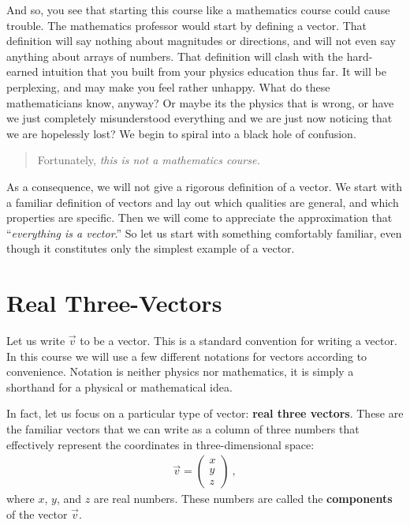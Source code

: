 \documentclass[12pt, oneside]{report}    %
\let\oldsection\section
\def\section{%
  \setcounter{sidenote}{1}%
  \oldsection
}
\begin{document}
And so, you see that starting this course like a mathematics course could cause trouble. The mathematics professor would start by defining a vector. That definition will say nothing about magnitudes or directions, and will not even say anything about arrays of numbers. That definition will clash with the hard-earned intuition that you built from your physics education thus far. It will be perplexing, and may make you feel rather unhappy. What do these mathematicians know, anyway? Or maybe its the physics that is wrong, or have we just completely misunderstood everything and we are just now noticing that we are hopelessly lost? We begin to spiral into a black hole of confusion.

\begin{quote}
Fortunately, \emph{this is not a mathematics course.}
\end{quote}

As a consequence, we will not give a rigorous definition of a vector. We start with a familiar definition of vectors and lay out which qualities are general, and which properties are specific. Then we will come to appreciate the approximation that ``\emph{everything is a vector}.'' So let us start with something comfortably familiar, even though it constitutes only the simplest example of a vector.


\section{Real Three-Vectors}

Let us write $\vec{v}$ to be a vector. This is a standard convention for writing a vector. In this course we will use a few different notations for vectors according to convenience. Notation is neither physics nor mathematics, it is simply a shorthand for a physical or mathematical idea. 

In fact, let us focus on a particular type of vector: \textbf{real three vectors}. These are the familiar vectors that we can write as a column of three numbers that effectively represent the coordinates in three-dimensional space:
\begin{align}
    \vec{v} = 
    \begin{pmatrix}
        x\\ y\\ z
    \end{pmatrix} \ ,
\end{align}
where $x$, $y$, and $z$ are real numbers. These numbers are called the \textbf{components} of the vector $\vec{v}$.
\end{document}
